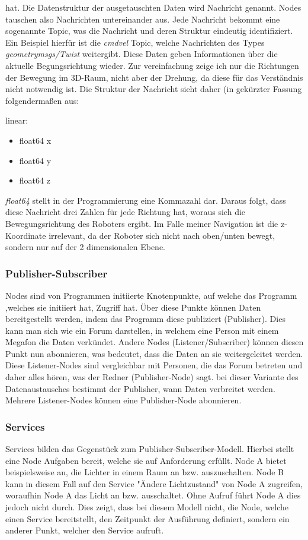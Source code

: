 {{{			hat. Die Datenstruktur der ausgetauschten Daten wird Nachricht genannt. Nodes tauschen also Nachrichten untereinander aus. Jede Nachricht bekommt eine sogenannte Topic, was die Nachricht und deren Struktur eindeutig identifiziert. Ein Beispiel hierfür ist die \textit{cmd\textunderscore vel} Topic, welche Nachrichten des Types \textit{geometry\textunderscore msgs/Twist} weitergibt. Diese Daten geben Informationen über die aktuelle Begungsrichtung wieder. Zur vereinfachung zeige ich nur die Richtungen der Bewegung im 3D-Raum, nicht aber der Drehung, da diese für das Verständnis nicht notwendig ist. Die Struktur der Nachricht sieht daher (in gekürzter Fassung folgendermaßen aus:
			\newline
			
			linear:
			\begin{itemize}
				\item float64 x
				\item float64 y
				\item float64 z
			\end{itemize}
			
			\textit{float64} stellt in der Programmierung eine Kommazahl dar. Daraus folgt, dass diese Nachricht drei Zahlen für jede Richtung hat, woraus sich die Bewegungsrichtung des Roboters ergibt. Im Falle meiner Navigation ist die z-Koordinate irrelevant, da der Roboter sich nicht nach oben/unten bewegt, sondern nur auf der 2 dimensionalen Ebene.
		}
		
		\subsubsection{Publisher-Subscriber}
		{
			Nodes sind von Programmen initiierte Knotenpunkte, auf welche das Programm ,welches sie initiiert hat, Zugriff hat. Über diese Punkte können Daten bereitgestellt werden, indem das Programm diese publiziert (Publisher). Dies kann man sich wie ein Forum darstellen, in welchem eine Person mit einem Megafon die Daten verkündet. Andere Nodes (Listener/Subscriber) können diesen Punkt nun abonnieren, was bedeutet, dass die Daten an sie weitergeleitet werden. Diese Listener-Nodes sind vergleichbar mit Personen, die das Forum betreten und daher alles hören, was der Redner (Publisher-Node) sagt. bei dieser Variante des Datenaustausches bestimmt der Publisher, wann Daten verbreitet werden. Mehrere Listener-Nodes können eine Publisher-Node abonnieren.
		}
		\subsubsection{Services}
		{ 
			Services bilden das Gegenstück zum Publisher-Subscriber-Modell. Hierbei stellt eine Node Aufgaben bereit, welche sie auf Anforderung erfüllt. Node A bietet beispielsweise an, die Lichter in einem Raum an bzw. auszuschalten. Node B kann in diesem Fall auf den Service "Ändere Lichtzustand" von Node A zugreifen, woraufhin Node A das Licht an bzw. ausschaltet. Ohne Aufruf führt Node A dies jedoch nicht durch. Dies zeigt, dass bei diesem Modell nicht, die Node, welche einen Service bereitstellt, den Zeitpunkt der Ausführung definiert, sondern ein anderer Punkt, welcher den Service aufruft.
		}
		
}}
